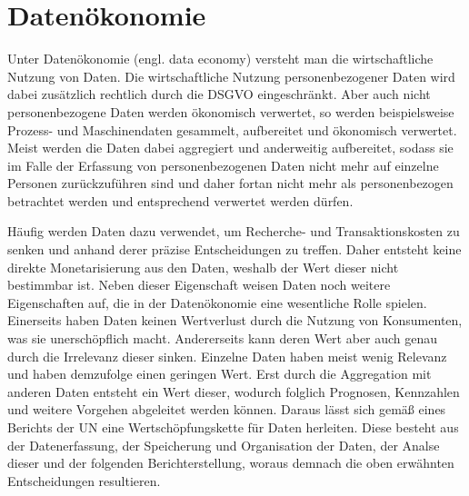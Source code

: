 \section{Datenökonomie}
Unter Datenökonomie (engl. data economy) versteht man die wirtschaftliche Nutzung von Daten. Die wirtschaftliche Nutzung personenbezogener Daten wird dabei zusätzlich rechtlich durch die DSGVO eingeschränkt. Aber auch nicht personenbezogene Daten werden ökonomisch verwertet, so werden beispielsweise Prozess- und Maschinendaten gesammelt, aufbereitet und ökonomisch verwertet. \cite{bpb_2019} Meist werden die Daten dabei aggregiert und anderweitig aufbereitet, sodass sie im Falle der Erfassung von personenbezogenen Daten nicht mehr auf einzelne Personen zurückzuführen sind und daher fortan nicht mehr als personenbezogen betrachtet werden und entsprechend verwertet werden dürfen. \newline

\noindent Häufig werden Daten dazu verwendet, um Recherche- und Transaktionskosten zu senken und anhand derer präzise Entscheidungen zu treffen. Daher entsteht keine direkte Monetarisierung aus den Daten, weshalb der Wert dieser nicht bestimmbar ist. Neben dieser Eigenschaft weisen Daten noch weitere Eigenschaften auf, die in der Datenökonomie eine wesentliche Rolle spielen. Einerseits haben Daten keinen Wertverlust durch die Nutzung von Konsumenten, was sie unerschöpflich macht. Andererseits kann deren Wert aber auch genau durch die Irrelevanz dieser sinken. Einzelne Daten haben meist wenig Relevanz und haben demzufolge einen geringen Wert. Erst durch die Aggregation mit anderen Daten entsteht ein Wert dieser, wodurch folglich Prognosen, Kennzahlen und weitere Vorgehen abgeleitet werden können. Daraus lässt sich gemäß eines Berichts der \gls{UN} eine Wertschöpfungskette für Daten herleiten. Diese besteht aus der Datenerfassung, der Speicherung und Organisation der Daten, der Analse dieser und der folgenden Berichterstellung, woraus demnach die oben erwähnten Entscheidungen resultieren. \cite{un_2019} \newline

